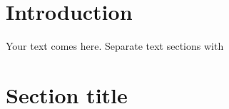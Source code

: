 \section{Introduction}
\label{intro}
Your text comes here. Separate text sections with



\section{Section title}
\label{sec-1}







